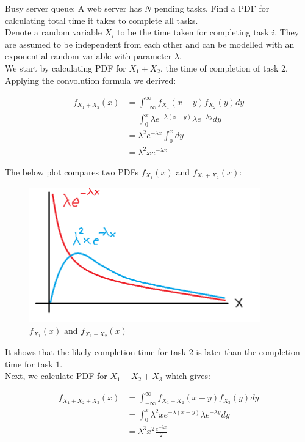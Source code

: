 \documentclass[12pt, a4paper]{article}
\newcounter{exa}
\begin{document}
\begin{texample}
Busy server queue: A web server has $N$ pending tasks. Find a PDF for calculating total time it takes to complete all tasks. \\

Denote a random variable $X_i$ to be the time taken for completing task $i$. They are assumed to be independent from each other and can be modelled with an exponential random variable with parameter $\lambda$. \\

We start by calculating PDF for $X_1+X_2$, the time of completion of task $2$. Applying the convolution formula we derived:

\begin{align*}
f_{X_1+X_2}(x)&=\int_{-\infty}^\infty f_{X_1}(x-y) f_{X_2}(y) dy \\
&=\int_0^x \lambda e^{-\lambda (x-y)} \lambda e^{-\lambda y} dy \\
&=\lambda^2 e^{-\lambda x} \int_0^x dy \\
&=\lambda^2 xe^{-\lambda x}
\end{align*}

The below plot compares two PDFs $f_{X_1}(x)$ and $f_{X_1+X_2}(x)$:

\begin{figure}[H]
\centering
\includegraphics[width=100mm]{29.png}
\caption{$f_{X_1}(x)$ and $f_{X_1+X_2}(x)$}
\end{figure}

It shows that the likely completion time for task $2$ is later than the completion time for task $1$. \\

Next, we calculate PDF for $X_1+X_2+X_3$ which gives:

\begin{align*}
f_{X_1+X_2+X_3}(x)&=\int_{-\infty}^\infty f_{X_1+X_2}(x-y) f_{X_3}(y) dy \\
&=\int_0^x \lambda^2 xe^{-\lambda (x-y)} \lambda e^{-\lambda y} dy \\
&=\lambda^3 x^2\frac{e^{-\lambda x}}{2}
\end{align*}


\end{texample}
\end{document}
